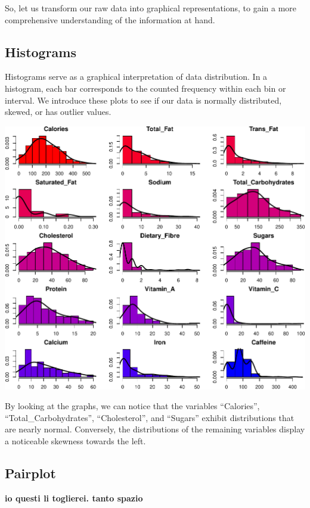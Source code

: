 \documentclass[
]{article}
\begin{document}
So, let us transform our raw data into graphical representations, to
gain a more comprehensive understanding of the information at hand.

\subsection{Histograms}\label{histograms}

Histograms serve as a graphical interpretation of data distribution. In
a histogram, each bar corresponds to the counted frequency within each
bin or interval. We introduce these plots to see if our data is normally
distributed, skewed, or has outlier values.

\begin{center}\includegraphics{Statistical_Learning_Final_Report_files/figure-latex/histograms-1} \end{center}

By looking at the graphs, we can notice that the variables ``Calories'',
``Total\_Carbohydrates'', ``Cholesterol'', and ``Sugars'' exhibit
distributions that are nearly normal. Conversely, the distributions of
the remaining variables display a noticeable skewness towards the left.

\subsection{Pairplot}\label{pairplot}

\textbf{io questi li toglierei. tanto spazio}
\end{document}
